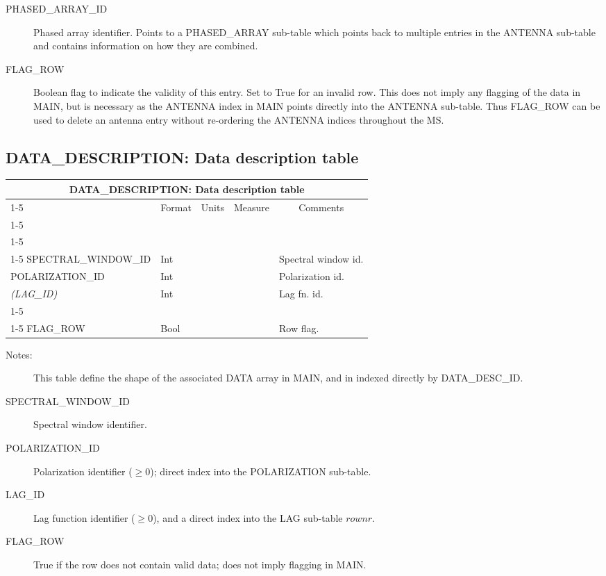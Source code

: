 \documentclass{article}
\newcommand{\defline}[1]{\cline{1-5}
\multicolumn{5}{|l|}{#1} \\
\cline{1-5}}
\newcommand{\definetable}[2]
{
	\vfill\newpage
	\subsection{#1}
        \vspace{0.15in}
        \small
	\begin{tabular}{|l|p{1.25in}|l|p{.9in}|p{1.4in}|}
	\hline
	\multicolumn{5}{|c|}{\bf #1}\\ 
	\cline{1-5}
        \multicolumn{1}{|c|}{Name}&\multicolumn{1}{|c|}{Format}&
        \multicolumn{1}{|c|}{Units}&\multicolumn{1}{|c|}{Measure}&
        \multicolumn{1}{|c|}{Comments}\\
        \cline{1-5}
        #2
        \hline
	\end{tabular}
}
\begin{document}
\begin{description}
\item[PHASED\_ARRAY\_ID] Phased array identifier. Points to a
PHASED\_ARRAY sub-table which points back to multiple entries in the
ANTENNA sub-table and contains information on how they are combined.

\item[FLAG\_ROW] Boolean flag to indicate the validity of this
entry. Set to True for an invalid row. This does not imply any
flagging of the data in MAIN, but is necessary as the ANTENNA index in
MAIN points directly into the ANTENNA sub-table. Thus FLAG\_ROW can be
used to delete an antenna entry without re-ordering the ANTENNA
indices throughout the MS.

\end{description}

\definetable{DATA\_DESCRIPTION: Data description table}{
\defline{\bf Columns}
\defline{\em Data}
SPECTRAL\_WINDOW\_ID & Int & & & Spectral window id.\\
POLARIZATION\_ID & Int & & & Polarization id.\\
{\it (LAG\_ID)} & Int & & & Lag fn. id.\\
\defline{\em Flags}
FLAG\_ROW & Bool & & & Row flag.\\
}
\begin{description}

\item[Notes:] This table define the shape of the associated DATA array
in MAIN, and in indexed directly by DATA\_DESC\_ID.

\item[SPECTRAL\_WINDOW\_ID] Spectral window identifier.

\item[POLARIZATION\_ID] Polarization identifier ($\geq 0$); direct
index into the POLARIZATION sub-table.

\item[LAG\_ID] Lag function identifier ($\geq 0$), and a direct index
into the LAG sub-table $rownr$.

\item[FLAG\_ROW] True if the row does not contain valid data; does not
imply flagging in MAIN.

\end{description}
\end{document}
